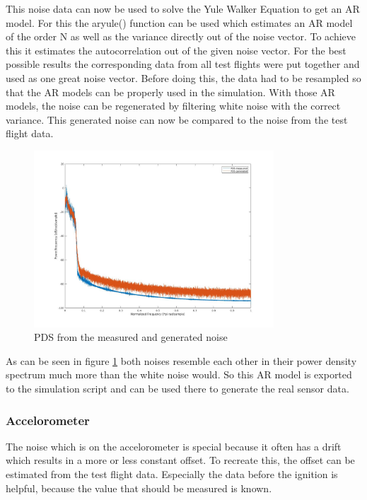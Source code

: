 This noise data can now be used to solve the Yule Walker Equation to get an AR model.
For this the aryule() function can be used which estimates an AR model of the order N as well as the variance directly out of the noise vector.
To achieve this it estimates the autocorrelation out of the given noise vector.
For the best possible results the corresponding data from all test flights were put together and used as one great noise vector.
Before doing this, the data had to be resampled so that the AR models can be properly used in the simulation.
With those AR models, the noise can be regenerated by filtering white noise with the correct variance.
This generated noise can now be compared to the noise from the test flight data.

\begin{figure}[h!]
 \centering
 \includegraphics[width=0.8\textwidth]{./Pictures/PDSnoise.jpg}
 \caption{PDS from the measured and generated noise}
 \label{fig:PDSNoise}
\end{figure}


As can be seen in figure \ref{fig:PDSNoise} both noises resemble each other in their power density spectrum much more than the white noise would.
So this AR model is exported to the simulation script and can be used there to generate the real sensor data.

\subsubsection{Accelorometer}
The noise which is on the accelorometer is special because it often has a drift which results in a more or less constant offset.
To recreate this, the offset can be estimated from the test flight data.
Especially the data before the ignition is helpful, because the value that should be measured is known.

